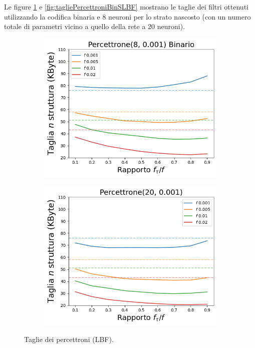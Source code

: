 \documentclass[../../main.tex]{subfiles}
\begin{document}
    Le figure \ref{fig:tagliePercettroniBinLBF} e \ref{fig:tagliePercettroniBinSLBF} mostrano le taglie dei filtri ottenuti utilizzando la codifica binaria e 8 neuroni per lo strato nascosto (con un numero totale di parametri vicino a quello della rete a 20 neuroni).

    \begin{figure}[H]
        \centering
        \begin{subfigure}[b]{0.48\textwidth}
            \centering
            \includegraphics[width=\textwidth]{immagini/7/LBF/Percettrone(8, 0.001) Binario_Taglia.png}
            \caption{}
        \end{subfigure}
        \begin{subfigure}[b]{0.48\textwidth}
            \centering
            \includegraphics[width=\textwidth]{immagini/7/LBF/Percettrone(20, 0.001)_Taglia.png}
            \caption{}
        \end{subfigure}
        \caption{Taglie dei percettroni (LBF).}
        \label{fig:tagliePercettroniBinLBF}
    \end{figure}
\end{document}
